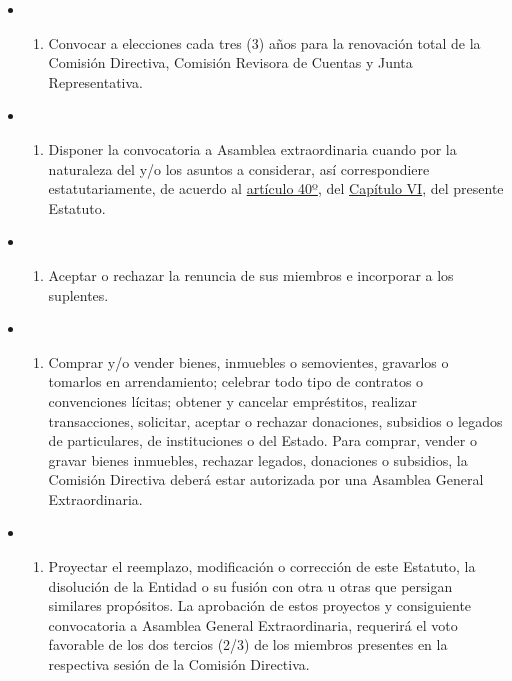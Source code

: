\documentclass[openany]{book}
\providecommand{\tightlist}{%
  \setlength{\itemsep}{0pt}\setlength{\parskip}{0pt}}
\begin{document}
\begin{itemize}
\begin{itemize}
\begin{enumerate}
    \end{enumerate}
  \item
    \begin{enumerate}
    \def\labelenumi{\alph{enumi})}
    \setcounter{enumi}{4}
    \tightlist
    \item
      Convocar a elecciones cada tres (3) años para la renovación total de la Comisión Directiva, Comisión Revisora de Cuentas y Junta Representativa.
    \end{enumerate}
  \item
    \begin{enumerate}
    \def\labelenumi{\alph{enumi})}
    \setcounter{enumi}{5}
    \tightlist
    \item
      Disponer la convocatoria a Asamblea extraordinaria cuando por la naturaleza del y/o los asuntos a considerar, así correspondiere estatutariamente, de acuerdo al \protect\hyperlink{art40}{artículo 40º}, del \protect\hyperlink{cap6}{Capítulo VI}, del presente Estatuto.
    \end{enumerate}
  \item
    \begin{enumerate}
    \def\labelenumi{\alph{enumi})}
    \setcounter{enumi}{6}
    \tightlist
    \item
      Aceptar o rechazar la renuncia de sus miembros e incorporar a los suplentes.
    \end{enumerate}
  \item
    \begin{enumerate}
    \def\labelenumi{\alph{enumi})}
    \setcounter{enumi}{7}
    \tightlist
    \item
      Comprar y/o vender bienes, inmuebles o semovientes, gravarlos o tomarlos en arrendamiento; celebrar todo tipo de contratos o convenciones lícitas; obtener y cancelar empréstitos, realizar transacciones, solicitar, aceptar o rechazar donaciones, subsidios o legados de particulares, de instituciones o del Estado. Para comprar, vender o gravar bienes inmuebles, rechazar legados, donaciones o subsidios, la Comisión Directiva deberá estar autorizada por una Asamblea General Extraordinaria.
    \end{enumerate}
  \item
    \begin{enumerate}
    \def\labelenumi{\roman{enumi})}
    \tightlist
    \item
      Proyectar el reemplazo, modificación o corrección de este Estatuto, la disolución de la Entidad o su fusión con otra u otras que persigan similares propósitos. La aprobación de estos proyectos y consiguiente convocatoria a Asamblea General Extraordinaria, requerirá el voto favorable de los dos tercios (2/3) de los miembros presentes en la respectiva sesión de la Comisión Directiva.

\end{enumerate}
\end{itemize}
\end{itemize}
\end{document}
